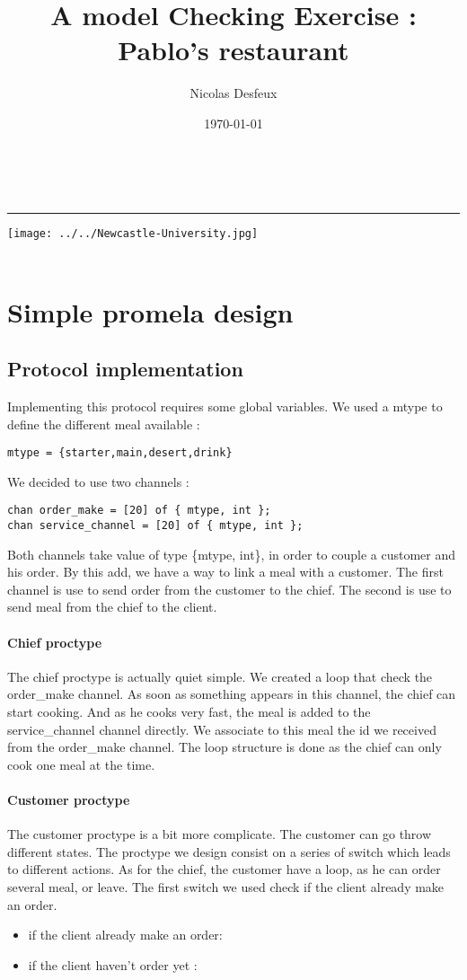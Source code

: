 \documentclass[a4paper,11pt]{article} %
\date{\today}
\author{Nicolas Desfeux}
\title{
{A model Checking Exercise : Pablo's restaurant
}}
\makeatletter
\def\maketitle{

	\begin{multicols}{2}
		{\begin{center}
		{\LARGE \@title}\\
		\rule{3cm}{1pt}
	\end{center}}
		\begin{flushright}
			{\texttt{[image: ../../Newcastle-University.jpg]}}\\
			{\@date}\\
		\end{flushright}
	\end{multicols}	
	\vspace{1cm}
}
\makeatother
\begin{document}
\maketitle
{}
\section{Simple promela design}
\subsection{Protocol implementation}
Implementing this protocol requires some global variables. 
We used a mtype to define the different meal available : 
\begin{lstlisting}
mtype = {starter,main,desert,drink}
\end{lstlisting}
 We decided to use two channels : 
\begin{lstlisting}
chan order_make = [20] of { mtype, int };
chan service_channel = [20] of { mtype, int };
\end{lstlisting}
Both channels take value of type \{mtype, int\}, in order to couple a customer and his order. By this add, we have a way to link a meal with a customer. The first channel is use to send order from the customer to the chief. The second is use to send meal from the chief to the client.
\paragraph{Chief proctype} The chief proctype is actually quiet simple. We created a loop that check the order\_make channel. As soon as something appears in this channel, the chief can start cooking. And as he cooks very fast, the meal is added to the service\_channel channel directly. We associate to this meal the id we received from the order\_make channel. The loop structure is done as the chief can only cook one meal at the time.
\paragraph{Customer proctype} The customer proctype is a bit more complicate. The customer can go throw different states. The proctype we design consist on a series of switch which leads to different actions. As for the chief, the customer have a loop, as he can order several meal, or leave.
The first switch we used check if the client already make an order.
\begin{itemize}
\item if the client already make an order: 
\item if the client haven't order yet : 
\end{itemize} 
\end{document}
